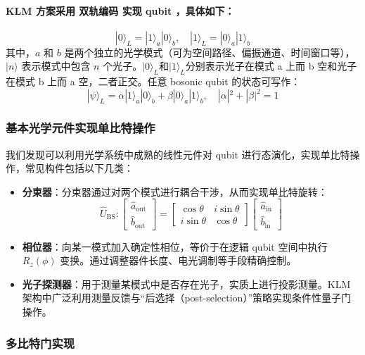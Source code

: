 \documentclass[hyperref, fntef, fancyhdr,zihao = -4,UTF8]{ctexart}
\begin{document}
\paragraph{KLM 方案采用 \textbf{双轨编码} 实现 qubit ，具体如下：}
\[
|0\rangle_L = |1\rangle_a |0\rangle_b,\quad |1\rangle_L = |0\rangle_a |1\rangle_b
\]
其中，$a$ 和 $b$ 是两个独立的光学模式（可为空间路径、偏振通道、时间窗口等），$|n\rangle$ 表示模式中包含 $n$ 个光子。$|0\rangle_L$和$|1\rangle_L$分别表示光子在模式 a 上而 b 空和光子在模式 b 上而 a 空，二者正交。任意 bosonic qubit 的状态可写作：
\[
|\psi\rangle_L = \alpha |1\rangle_a |0\rangle_b + \beta |0\rangle_a |1\rangle_b,\quad  |\alpha|^2 + |\beta|^2 = 1
\]

\subsubsection{基本光学元件实现单比特操作}

我们发现可以利用光学系统中成熟的线性元件对 qubit 进行态演化，实现单比特操作，常见构件包括以下几类：

\begin{itemize}
  \item \textbf{分束器}：分束器通过对两个模式进行耦合干涉，从而实现单比特旋转：
  \[
  \hat{U}_{\text{BS}}:
  \begin{bmatrix}
  \hat{a}_{\text{out}} \\
  \hat{b}_{\text{out}}
  \end{bmatrix}
  =
  \begin{bmatrix}
  \cos \theta & i \sin \theta \\
  i \sin \theta & \cos \theta
  \end{bmatrix}
  \begin{bmatrix}
  \hat{a}_{\text{in}} \\
  \hat{b}_{\text{in}}
  \end{bmatrix}
  \]
  
  \item \textbf{相位器}：向某一模式加入确定性相位，等价于在逻辑 qubit 空间中执行 $R_z(\phi)$ 变换。通过调整器件长度、电光调制等手段精确控制。

  \item \textbf{光子探测器}：用于测量某模式中是否存在光子，实质上进行投影测量。KLM 架构中广泛利用测量反馈与“后选择（post-selection）”策略实现条件性量子门操作。
\end{itemize}

\subsubsection{多比特门实现}
\end{document}
